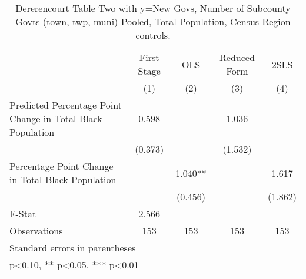 \begin{table}[htbp]\centering
\def\sym#1{\ifmmode^{#1}\else\(^{#1}\)\fi}
\caption{Dererencourt Table Two with y=New Govs, Number of Subcounty Govts (town, twp, muni)  Pooled, Total Population, Census Region controls.}
\begin{tabular}{l*{4}{c}}
\toprule
                    & First Stage   &         OLS   &Reduced Form   &        2SLS   \\
                    &\multicolumn{1}{c}{(1)}   &\multicolumn{1}{c}{(2)}   &\multicolumn{1}{c}{(3)}   &\multicolumn{1}{c}{(4)}   \\
\midrule
Predicted Percentage Point Change in Total Black Population&       0.598   &               &       1.036   &               \\
                    &     (0.373)   &               &     (1.532)   &               \\
\addlinespace
Percentage Point Change in Total Black Population&               &       1.040** &               &       1.617   \\
                    &               &     (0.456)   &               &     (1.862)   \\
\midrule
F-Stat              &       2.566   &               &               &               \\
Observations        &         153   &         153   &         153   &         153   \\
\bottomrule
\multicolumn{5}{l}{\footnotesize Standard errors in parentheses}\\
\multicolumn{5}{l}{\footnotesize * p<0.10, ** p<0.05, *** p<0.01}\\
\end{tabular}
\end{table}
